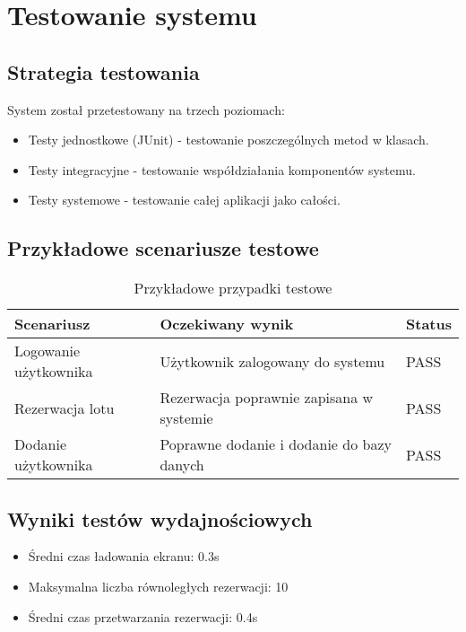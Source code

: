 \section{Testowanie systemu}

\subsection{Strategia testowania}
System został przetestowany na trzech poziomach:
\begin{itemize}
\item Testy jednostkowe (JUnit) - testowanie poszczególnych metod w klasach.
\item Testy integracyjne - testowanie współdziałania komponentów systemu.
\item Testy systemowe - testowanie całej aplikacji jako całości.
\end{itemize}

\subsection{Przykładowe scenariusze testowe}
\begin{table}[H]
\centering
\caption{Przykładowe przypadki testowe}
\begin{tabular}{|l|l|l|}
\hline
\textbf{Scenariusz} & \textbf{Oczekiwany wynik} & \textbf{Status} \\ \hline
Logowanie użytkownika & Użytkownik zalogowany do systemu & PASS \\ \hline
Rezerwacja lotu & Rezerwacja poprawnie zapisana w systemie & PASS \\ \hline
Dodanie użytkownika & Poprawne dodanie  i dodanie do bazy danych  & PASS \\ \hline
\end{tabular}
\end{table}

\subsection{Wyniki testów wydajnościowych}
\begin{itemize}
\item Średni czas ładowania ekranu: 0.3s
\item Maksymalna liczba równoległych rezerwacji: 10
\item Średni czas przetwarzania rezerwacji: 0.4s
\end{itemize}
